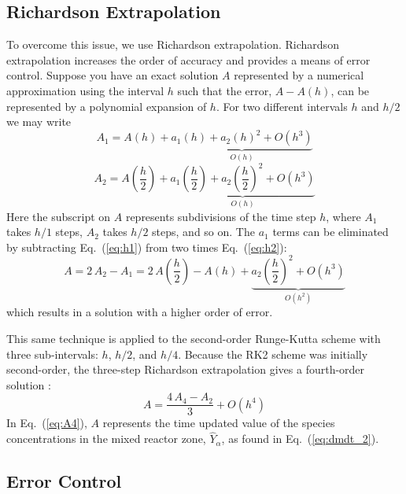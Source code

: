 \subsection*{Richardson Extrapolation}

To overcome this issue, we use Richardson extrapolation. Richardson extrapolation increases the order of accuracy and provides a means of error control. Suppose you have an exact solution $A$ represented by a numerical approximation using the interval $h$ such that the error, $A-A(h)$, can be represented by a polynomial expansion of $h$. For
two different intervals $h$ and $h/2$ we may write
\begin{equation}\label{eq:h1}
A_1={A(h)} + \underbrace{a_{1}(h) + a_{2}(h)^2 + \mathit{O}(h^3)}_{\mathit{O}(h)}
\end{equation}
\begin{equation}\label{eq:h2}
A_2=A\left(\frac{h}{2}\right) + \underbrace{a_{1}\left(\frac{h}{2}\right) + a_{2}\left(\frac{h}{2}\right)^2 + \mathit{O}(h^3)}_{\mathit{O}(h)}
\end{equation}
Here the subscript on $A$ represents subdivisions of the time step $h$, where $A_1$ takes $h/1$ steps, $A_2$ takes $h/2$ steps, and so on. The $a_{1}$ terms can be eliminated by subtracting Eq.~(\ref{eq:h1}) from two times Eq.~(\ref{eq:h2}):
\begin{equation}\label{eq:A2}
A=2\,A_2-A_1 = 2\,A\left(\frac{h}{2}\right) - A(h) + \underbrace{a_{2}\left(\frac{h}{2}\right)^2 + \mathit{O}(h^3)}_{\mathit{O}(h^2)}
\end{equation}
which results in a solution with a higher order of error.

This same technique is applied to the second-order Runge-Kutta scheme with three sub-intervals: $h$, $h/2$, and $h/4$. Because the RK2 scheme was initially second-order, the three-step Richardson extrapolation gives a fourth-order solution \cite{Moin:2001}:
\begin{equation}\label{eq:A4}
A=\frac{4\,A_4-A_2}{3}  + \mathit{O}(h^4)
\end{equation}
In Eq.~(\ref{eq:A4}), $A$ represents the time updated value of the species concentrations in the mixed reactor zone, $\hat{Y}_{\alpha}$, as found in Eq.~(\ref{eq:dmdt_2}).

\subsection*{Error Control}

